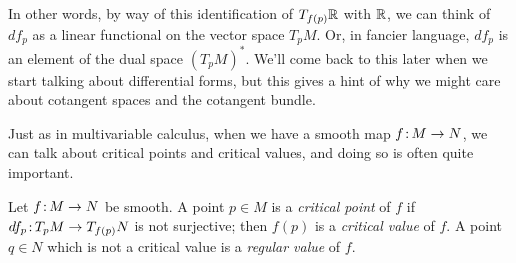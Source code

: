 In other words, by way of this identification of $T_{f(p)} \mathbb{R}$ with $\mathbb{R}$, we can think of $df_p$ as a linear functional on the vector space $T_pM$. Or, in fancier language, $df_p$ is an element of the dual space $\left(T_pM\right)^\ast$. We'll come back to this later when we start talking about differential forms, but this gives a hint of why we might care about cotangent spaces and the cotangent bundle.

Just as in multivariable calculus, when we have a smooth map $f \colon\thinspace\!\! M \to N$, we can talk about critical points and critical values, and doing so is often quite important.

\begin{definition}\label{def:critical points}
	Let $f \colon\thinspace\!\! M \to N$ be smooth. A point $p \in M$ is a \emph{critical point} of $f$ if $df_p\colon\thinspace\!\! T_p M \to T_{f(p)}N$ is not surjective; then $f(p)$ is a \emph{critical value} of $f$. A point $q \in N$ which is not a critical value is a \emph{regular value} of $f$.
\end{definition}


